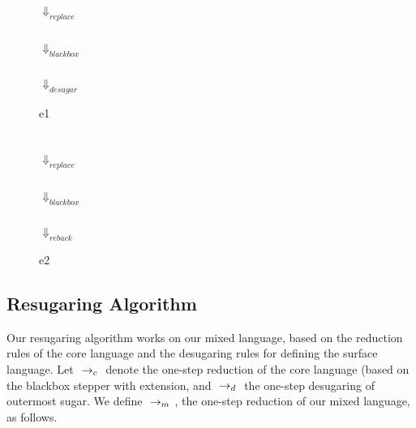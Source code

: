 \begin{center}
\begin{figure}[h]
\centering
{}\\ $\Downarrow_{replace}$\\ \\ $\Downarrow_{blackbox}$\\ \\ $\Downarrow_{desugar}$\\ 
\caption{e1}
\label{fig:e1}
\end{figure}

\begin{figure}[h]
\centering
{}\\ $\Downarrow_{replace}$ \\\\ $\Downarrow_{blackbox}$\\  \\ $\Downarrow_{reback}$\\ 
\caption{e2}
\label{fig:e2}
\end{figure}



\end{center}

\subsection{Resugaring Algorithm}

Our resugaring algorithm works on our mixed language, based on the reduction rules of the core language and the desugaring rules for defining the surface language. Let $~\rightarrow_c~$ denote the one-step reduction of the core language (based on the blackbox stepper with extension, and $~\rightarrow_d~$ the one-step desugaring of outermost sugar. We define $~\rightarrow_m~$, the one-step reduction of our mixed language, as follows.

\label{mark:miexedreduction}
{}

{}

